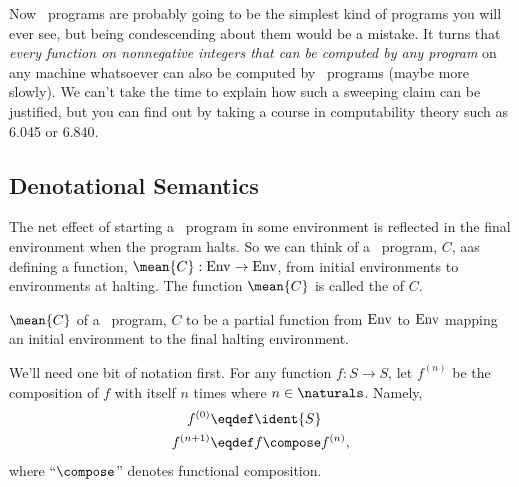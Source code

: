 Now \while\ programs are probably going to be the simplest kind of programs you will
ever see, but being condescending about them would be a mistake.  It turns
that \emph{every function on nonnegative integers that can be computed by
  any program} on any machine whatsoever can also be computed by \while\ programs
(maybe more slowly).  We can't take the time to explain how such a
sweeping claim can be justified, but you can find out by taking a course
in computability theory such as 6.045 or 6.840.

\subsection{Denotational Semantics}

The net effect of starting a \while\ program in some environment is reflected in the
final environment when the program halts.  So we can think of a \while\ program, $C$,
aas defining a function, $\mean{C}:\Env \to \Env$, from initial
environments to environments at halting.  The function $\mean{C}$ is
called the  of $C$.

$\mean{C}$ of a \while\ program, $C$ to be a partial function from $\text{Env}$ to $\text{Env}$
mapping an initial environment to the final halting environment.

We'll need one bit of notation first.  For any function $f:S \to S$, let
$f^{(n)}$ be the composition of $f$ with itself $n$ times where $n \in
\naturals$.   Namely,
\begin{align*}
f^{(0)} & \eqdef \ident{S}\\
f^{(n+1)} & \eqdef f \compose f^{(n)},
\end{align*}
where ``$\compose$'' denotes functional composition.

